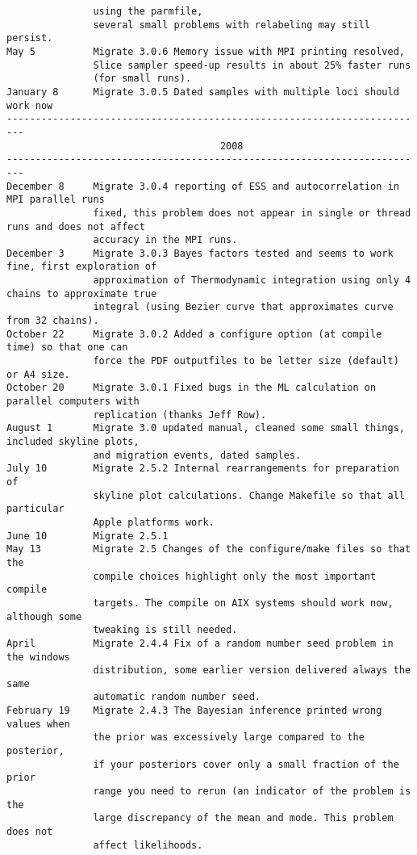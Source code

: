 \begin{small}
\begin{verbatim}
               using the parmfile,
               several small problems with relabeling may still persist.
May 5          Migrate 3.0.6 Memory issue with MPI printing resolved, 
               Slice sampler speed-up results in about 25% faster runs 
               (for small runs). 
January 8      Migrate 3.0.5 Dated samples with multiple loci should work now
-------------------------------------------------------------------------
                                     2008
-------------------------------------------------------------------------
December 8     Migrate 3.0.4 reporting of ESS and autocorrelation in MPI parallel runs
               fixed, this problem does not appear in single or thread runs and does not affect 
               accuracy in the MPI runs.
December 3     Migrate 3.0.3 Bayes factors tested and seems to work fine, first exploration of 
               approximation of Thermodynamic integration using only 4 chains to approximate true
               integral (using Bezier curve that approximates curve from 32 chains).
October 22     Migrate 3.0.2 Added a configure option (at compile time) so that one can
               force the PDF outputfiles to be letter size (default) or A4 size.
October 20     Migrate 3.0.1 Fixed bugs in the ML calculation on parallel computers with 
               replication (thanks Jeff Row).  
August 1       Migrate 3.0 updated manual, cleaned some small things, included skyline plots,
               and migration events, dated samples. 
July 10        Migrate 2.5.2 Internal rearrangements for preparation of 
               skyline plot calculations. Change Makefile so that all particular
               Apple platforms work.
June 10        Migrate 2.5.1 
May 13         Migrate 2.5 Changes of the configure/make files so that the
               compile choices highlight only the most important compile 
               targets. The compile on AIX systems should work now, although some
               tweaking is still needed.
April          Migrate 2.4.4 Fix of a random number seed problem in the windows
               distribution, some earlier version delivered always the same 
               automatic random number seed.
February 19    Migrate 2.4.3 The Bayesian inference printed wrong values when
               the prior was excessively large compared to the posterior,
               if your posteriors cover only a small fraction of the prior
               range you need to rerun (an indicator of the problem is the
               large discrepancy of the mean and mode. This problem does not 
               affect likelihoods.

\end{verbatim}
\end{small}
